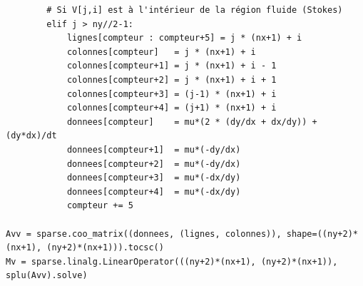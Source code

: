 \begin{verbatim}
        # Si V[j,i] est à l'intérieur de la région fluide (Stokes)
        elif j > ny//2-1:
            lignes[compteur : compteur+5] = j * (nx+1) + i
            colonnes[compteur]   = j * (nx+1) + i
            colonnes[compteur+1] = j * (nx+1) + i - 1
            colonnes[compteur+2] = j * (nx+1) + i + 1
            colonnes[compteur+3] = (j-1) * (nx+1) + i
            colonnes[compteur+4] = (j+1) * (nx+1) + i
            donnees[compteur]    = mu*(2 * (dy/dx + dx/dy)) + (dy*dx)/dt
            donnees[compteur+1]  = mu*(-dy/dx)
            donnees[compteur+2]  = mu*(-dy/dx)
            donnees[compteur+3]  = mu*(-dx/dy)
            donnees[compteur+4]  = mu*(-dx/dy)
            compteur += 5
        
Avv = sparse.coo_matrix((donnees, (lignes, colonnes)), shape=((ny+2)*(nx+1), (ny+2)*(nx+1))).tocsc()
Mv = sparse.linalg.LinearOperator(((ny+2)*(nx+1), (ny+2)*(nx+1)), splu(Avv).solve)
\end{verbatim}
       

